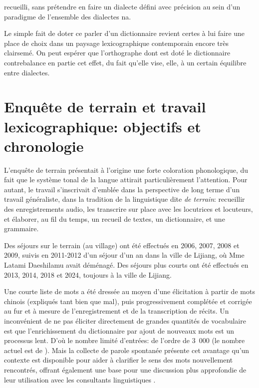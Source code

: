 recueilli, sans prétendre en faire un dialecte défini avec précision au sein d'un paradigme de l'ensemble des dialectes na.

Le simple fait de doter ce parler d'un dictionnaire revient certes à lui faire une place de choix dans un paysage lexicographique contemporain encore très clairsemé. On peut espérer que l'orthographe dont est doté le dictionnaire contrebalance en partie cet effet, du fait qu'elle vise, elle, à un certain équilibre entre dialectes.



\section{Enquête de terrain et travail lexicographique: objectifs et chronologie}
\label{sec:chronologie}


L'enquête de terrain présentait à l'origine une forte coloration phonologique, du fait que le système tonal de la langue attirait particulièrement l'attention. Pour autant, le travail s'inscrivait d'emblée dans la perspective de long terme d'un travail généraliste, dans la tradition de la linguistique dite \emph{de terrain}: recueillir des enregistrements audio, les transcrire sur place avec les locutrices et locuteurs, et élaborer, au fil du temps, un recueil de textes, un dictionnaire, et une grammaire.

Des séjours sur le terrain (au village) ont été effectués en 2006, 2007, 2008 et 2009, suivis en 2011-2012 d'un séjour d'un an dans la ville de Lijiang, où Mme Latami Daeshilamu avait déménagé. Des séjours plus courts ont été effectués en 2013, 2014, 2018 et 2024, toujours à la ville de Lijiang.

Une courte liste de mots a été dressée au moyen d'une élicitation à partir de mots chinois (expliqués tant bien que mal), puis progressivement complétée et corrigée au fur et à mesure de l'enregistrement et de la transcription de récits. Un inconvénient de ne pas éliciter directement de grandes quantités de vocabulaire est que l'enrichissement du dictionnaire par ajout de nouveaux mots est un processus lent. D'où le nombre limité d'entrées: de l'ordre de 3~000 (le nombre actuel est de ). Mais la collecte de parole spontanée présente cet avantage qu'un contexte est disponible pour aider à clarifier le sens des mots nouvellement rencontrés, offrant également une base pour une discussion plus approfondie de leur utilisation avec les consultants linguistiques \parencite[44]{mosel_dictionary_2004}.


